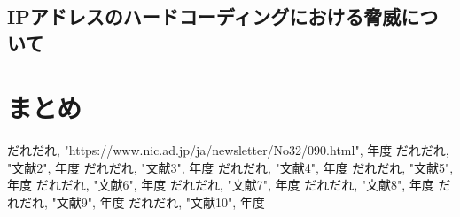 \documentclass[a4j]{jarticle}
\begin{document}
\subsection{IPアドレスのハードコーディングにおける脅威について}

\newpage
\section{まとめ}

\newpage
\begin{thebibliography}{99}
だれだれ, "https://www.nic.ad.jp/ja/newsletter/No32/090.html", 年度
だれだれ, "文献2", 年度
だれだれ, "文献3", 年度
だれだれ, "文献4", 年度
だれだれ, "文献5", 年度
だれだれ, "文献6", 年度
だれだれ, "文献7", 年度
だれだれ, "文献8", 年度
だれだれ, "文献9", 年度
だれだれ, "文献10", 年度

\end{thebibliography}
\end{document}

